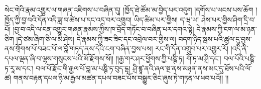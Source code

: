 སེང་གེའི་རྣམ་འགྱུར་ལ་གཞན་འཇིགས་པ་བཞིན་དུ། །ཁྱོད་ཐེ་ཚོམ་མ་བྱེད་པར་འདུག །དགོས་པ་ཡངས་པས་ཆོག །ཁྱོད་ཀྱི་བྱ་བའི་དོན་འདི་ཟླ་བ་ཚེས་པ་དང་འདྲ་བར་འགྲུབ། ཡིད་ཚིམ་པར་གྱིས། ད་ཝ་ཡ། ཤེས་པར་གྱིས་ཤིག་དྲི་བ་པོ། །བྱ་བ་འདི་ལ་ངན་འགྱུར་གཞན་རྣམས་ཀྱིས་ཁ་བྲོད་གཏོང་བ་བཞིན་པར་དགའ་སྟེ། དེ་རྣམས་ཀྱི་ངག་ལ་མ་ཉན་ཅིག །དེ་ཙམ་ཞིག་ཅི་ལ་མི་ཤེས། དེ་རྣམས་ཀྱི་ཟང་ཟིང་དང་འབྲེལ་བར་གྱིས་ལ། བདག་ཉིད་སྦས་པའི་ཚུལ་དུ་བྱས་ནས་གྲོགས་པོ་བཟང་པོ་ལ་བློ་གཏད་ནས་དེའི་ངག་བཞིན་བྱས་པས། རང་གི་དོན་འགྲུབ་པར་འགྱུར་རོ། །འདི་ནི་དཔལ་ལྡན་ཞི་བ་ལྷས་གསུངས་པའི་མོ་རྫོགས་སོ།། །།རྒྱ་གར་ཤར་ཕྱོགས་ཀྱི་པཎྚི་ཏ། གོ་ཏ་མ་ཤྲི་དང་། བལ་པོའི་པཎྚི་ཏ་རཱ་མ་དང་། བལ་པོ་རྫོང་གི་རྒྱལ་པོ་བླ་མ་པཎྚི་ཏ་བུད་དྷ། ཤྲི་ཛྙཱ་ནའི་ཞལ་སྔ་ནས་མཉན་ནས་མང་དུ་ཐོས་པའི་ལོ་ཚ། གནས་བརྟན་དཔལ་ཉི་མ་རྒྱལ་མཚན་དཔལ་བཟང་པོས་བསྒྱུར་ཅིང་ཞུས་ཏེ་གཏན་ལ་ཕབ་པའོ།། །།